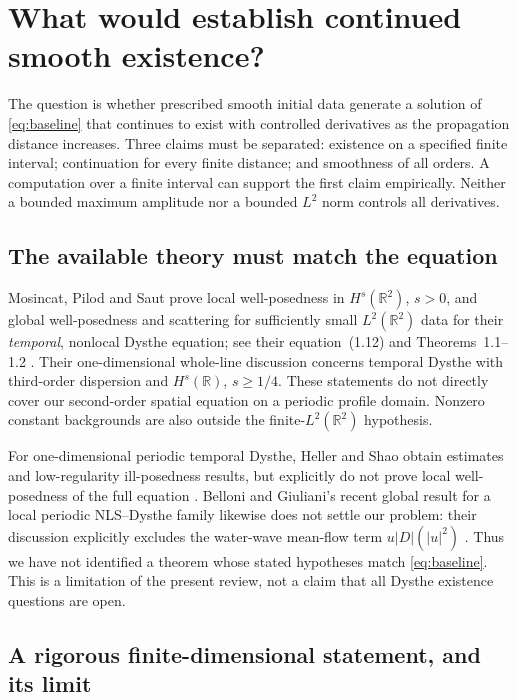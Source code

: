 \section{What would establish continued smooth existence?}
\label{sec:existence}

The question is whether prescribed smooth initial data generate a solution
of \eqref{eq:baseline} that continues to exist with controlled derivatives
as the propagation distance increases. Three claims must be separated:
existence on a specified finite interval; continuation for every finite
distance; and smoothness of all orders. A computation over a finite interval
can support the first claim empirically. Neither a bounded maximum amplitude
nor a bounded $L^2$ norm controls all derivatives.

\subsection{The available theory must match the equation}

Mosincat, Pilod and Saut prove local well-posedness in
$H^s(\mathbb R^2)$, $s>0$, and global well-posedness and scattering for
sufficiently small $L^2(\mathbb R^2)$ data for their \emph{temporal}, nonlocal
Dysthe equation; see their equation~(1.12) and Theorems~1.1--1.2
\cite{mps}. Their one-dimensional whole-line discussion concerns temporal
Dysthe with third-order dispersion and $H^s(\mathbb R)$, $s\geq1/4$.
These statements do not directly cover our second-order spatial equation
on a periodic profile domain. Nonzero constant backgrounds are also outside
the finite-$L^2(\mathbb R^2)$ hypothesis.

For one-dimensional periodic temporal Dysthe, Heller and Shao obtain
estimates and low-regularity ill-posedness results, but explicitly do not
prove local well-posedness of the full equation \cite[\S1.5]{heller}.
Belloni and Giuliani's recent global result for a local periodic
NLS--Dysthe family likewise does not settle our problem: their discussion
explicitly excludes the water-wave mean-flow term $u|D|(|u|^2)$
\cite[pp.~5--6]{belloni}. Thus we have not identified a theorem whose stated
hypotheses match \eqref{eq:baseline}. This is a limitation of the present
review, not a claim that all Dysthe existence questions are open.

\subsection{A rigorous finite-dimensional statement, and its limit}

